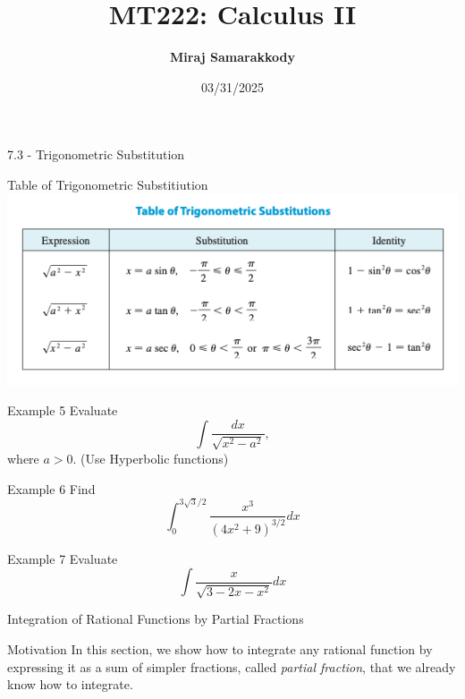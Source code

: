 \documentclass{beamer}
\title{MT222: Calculus II}
\author{\textbf{Miraj Samarakkody}}
\institute{Tougaloo College}
\date{03/31/2025}
\begin{document}
\begin{frame}
    \titlepage
\end{frame}




\begin{frame}{}
    \begin{center}
        \Huge{7.3 - Trigonometric Substitution}
    \end{center}
    
\end{frame}



\begin{frame}{Table of Trigonometric Substitiution}
    \includegraphics[scale=0.6]{figures/fig_1.png}
\end{frame}


\begin{frame}{Example 5}
    Evaluate \[\int \dfrac{dx}{\sqrt{x^2-a^2}},\] where \(a>0\). (Use Hyperbolic functions)
    
\end{frame}

\begin{frame}{Example 6}
    Find \[\int_{0}^{3\sqrt{3}/2}\dfrac{x^3}{(4x^2+9)^{3/2}}dx\]
\end{frame}

\begin{frame}{Example 7}
    Evaluate \[\int \dfrac{x}{\sqrt{3-2x-x^2}}dx\]
\end{frame}

\begin{frame}{}
\begin{center}
    \Huge{Integration of Rational Functions by Partial Fractions}
\end{center}
\end{frame}

\begin{frame}{Motivation}
In this section, we show how to integrate any rational function by expressing it as a sum of simpler fractions, called \textit{partial fraction}, that we already know how to integrate. 
\end{frame}
\end{document}
